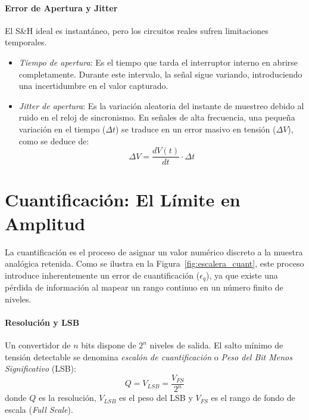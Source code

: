 \paragraph{Error de Apertura y Jitter}
El S\&H ideal es instantáneo, pero los circuitos reales sufren limitaciones temporales. 
\begin{itemize}
    \item \emph{Tiempo de apertura}: Es el tiempo que tarda el interruptor interno en abrirse completamente. Durante este intervalo, la señal sigue variando, introduciendo una incertidumbre en el valor capturado.
    \item \emph{Jitter de apertura}: Es la variación aleatoria del instante de muestreo debido al ruido en el reloj de sincronismo. En señales de alta frecuencia, una pequeña variación en el tiempo ($\Delta t$) se traduce en un error masivo en tensión ($\Delta V$), como se deduce de:
    \begin{equation}
        \Delta V = \frac{dV(t)}{dt} \cdot \Delta t
    \end{equation}
\end{itemize}


\section{Cuantificación: El Límite en Amplitud}\label{sec:cuantificacion}

La cuantificación es el proceso de asignar un valor numérico discreto a la muestra analógica retenida. Como se ilustra en la Figura~\ref{fig:escalera_cuant}, este proceso introduce inherentemente un error de cuantificación ($\epsilon_q$), ya que existe una pérdida de información al mapear un rango continuo en un número finito de niveles.

\paragraph{Resolución y LSB}
Un convertidor de $n$ bits dispone de $2^n$ niveles de salida. El salto mínimo de tensión detectable se denomina \emph{escalón de cuantificación} o \emph{Peso del Bit Menos Significativo} (LSB):
\begin{equation}
    Q = V_{LSB} = \frac{V_{FS}}{2^n}
\end{equation}
donde $Q$ es la resolución, $V_{LSB}$ es el peso del LSB y $V_{FS}$ es el rango de fondo de escala (\textit{Full Scale}).

